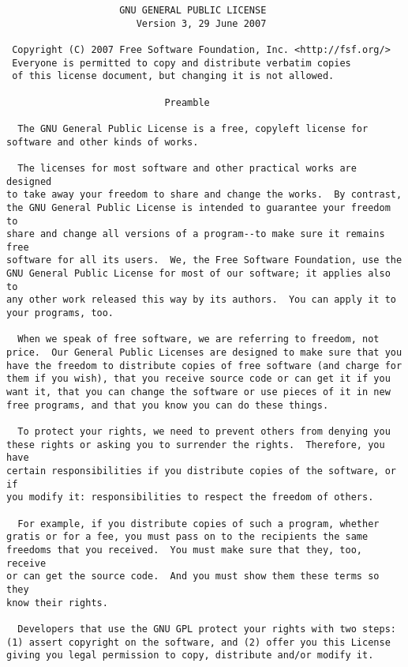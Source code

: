 \documentclass[11pt,twoside,fleqn,openright,titlepage]{cslreport}
\begin{document}
\begin{small}
\begin{verbatim}
                    GNU GENERAL PUBLIC LICENSE
                       Version 3, 29 June 2007

 Copyright (C) 2007 Free Software Foundation, Inc. <http://fsf.org/>
 Everyone is permitted to copy and distribute verbatim copies
 of this license document, but changing it is not allowed.

                            Preamble

  The GNU General Public License is a free, copyleft license for
software and other kinds of works.

  The licenses for most software and other practical works are designed
to take away your freedom to share and change the works.  By contrast,
the GNU General Public License is intended to guarantee your freedom to
share and change all versions of a program--to make sure it remains free
software for all its users.  We, the Free Software Foundation, use the
GNU General Public License for most of our software; it applies also to
any other work released this way by its authors.  You can apply it to
your programs, too.

  When we speak of free software, we are referring to freedom, not
price.  Our General Public Licenses are designed to make sure that you
have the freedom to distribute copies of free software (and charge for
them if you wish), that you receive source code or can get it if you
want it, that you can change the software or use pieces of it in new
free programs, and that you know you can do these things.

  To protect your rights, we need to prevent others from denying you
these rights or asking you to surrender the rights.  Therefore, you have
certain responsibilities if you distribute copies of the software, or if
you modify it: responsibilities to respect the freedom of others.

  For example, if you distribute copies of such a program, whether
gratis or for a fee, you must pass on to the recipients the same
freedoms that you received.  You must make sure that they, too, receive
or can get the source code.  And you must show them these terms so they
know their rights.

  Developers that use the GNU GPL protect your rights with two steps:
(1) assert copyright on the software, and (2) offer you this License
giving you legal permission to copy, distribute and/or modify it.


\end{verbatim}
\end{small}
\end{document}
